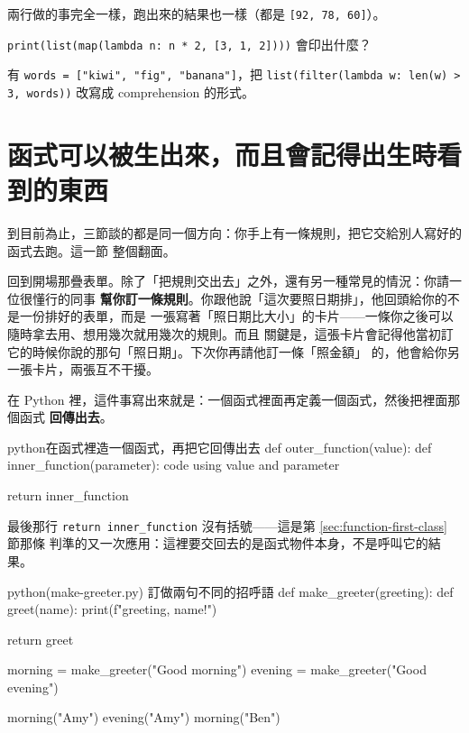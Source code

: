 兩行做的事完全一樣，跑出來的結果也一樣（都是 \texttt{[92, 78, 60]}）。


\begin{drills}[label=drills:map-filter]
\item \texttt{print(list(map(lambda n: n * 2, [3, 1, 2])))} 會印出什麼？
\item 有 \texttt{words = ["kiwi", "fig", "banana"]}，把
\texttt{list(filter(lambda w: len(w) > 3, words))} 改寫成 comprehension 的形式。
\end{drills}

\section{函式可以被生出來，而且會記得出生時看到的東西}
\label{sec:closure}

到目前為止，三節談的都是同一個方向：你手上有一條規則，把它交給別人寫好的函式去跑。這一節
整個翻面。

回到開場那疊表單。除了「把規則交出去」之外，還有另一種常見的情況：你請一位很懂行的同事
\textbf{幫你訂一條規則}。你跟他說「這次要照日期排」，他回頭給你的不是一份排好的表單，而是
一張寫著「照日期比大小」的卡片——一條你之後可以隨時拿去用、想用幾次就用幾次的規則。而且
關鍵是，這張卡片會記得他當初訂它的時候你說的那句「照日期」。下次你再請他訂一條「照金額」
的，他會給你另一張卡片，兩張互不干擾。

在 Python 裡，這件事寫出來就是：一個函式裡面再定義一個函式，然後把裡面那個函式
\textbf{回傳出去}。

\begin{code}{python}{在函式裡造一個函式，再把它回傳出去}
def outer_function(value):
    def inner_function(parameter):
        code using value and parameter

    return inner_function
\end{code}

最後那行 \texttt{return inner\_function} 沒有括號——這是第 \ref{sec:function-first-class} 節那條
判準的又一次應用：這裡要交回去的是函式物件本身，不是呼叫它的結果。

\begin{example}{python}{(make-greeter.py) 訂做兩句不同的招呼語}
def make_greeter(greeting):
    def greet(name):
        print(f"{greeting}, {name}!")

    return greet


morning = make_greeter("Good morning")
evening = make_greeter("Good evening")

morning("Amy")
evening("Amy")
morning("Ben")
\end{example}

